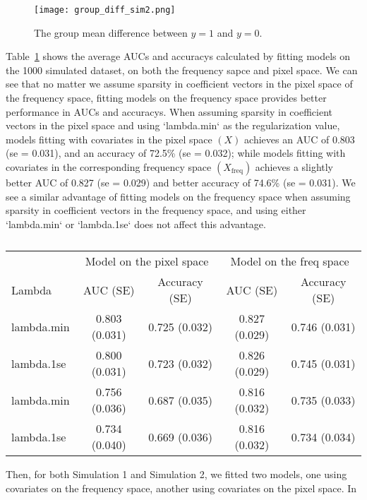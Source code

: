 \documentclass[12pt]{article}
\begin{document}
\begin{figure}[htbp]
	\centering
	\texttt{[image: group\_diff\_sim2.png]}
	\caption{The group mean difference between \( y = 1 \) and \( y = 0 \).}
	\label{fig:group_diff2}
\end{figure}

Table~\ref*{tab:auc_acc_table} shows the average AUCs and accuracys calculated
by fitting models on the 1000 simulated dataset, on both the frequency sapce
and pixel space. We can see that no matter we assume sparsity in coefficient
vectors in the pixel space of the frequency space, fitting models on the
frequency space provides better performance in AUCs and accuracys. When
assuming sparsity in coefficient vectors in the pixel space and using
`lambda.min` as the regularization value, models fitting with covariates in
the pixel space \( (X) \) achieves an AUC of 0.803 (se = 0.031), and an
accuracy of 72.5\% (se = 0.032); while models fitting with covariates in the
corresponding frequency space \( (X_{\text{freq}}) \) achieves a slightly
better AUC of 0.827 (se = 0.029) and better accuracy of 74.6\% (se = 0.031).
We see a similar advantage of fitting models on the frequency space when
assuming sparsity in coefficient vectors in the frequency space, and using
either `lambda.min` or `lambda.1se` does not affect this advantage.

\begin{table}[htbp]
\centering
\caption{}
\label{tab:auc_acc_table}
\begin{tabular}{l|cc|cc}
\toprule
& \multicolumn{2}{c}{Model on the pixel space} & \multicolumn{2}{c}{Model on the freq space} \\ 
	Lambda & AUC (SE) & Accuracy (SE) & AUC (SE) & Accuracy (SE) \\ 
\midrule
	lambda.min & 0.803 (0.031) & 0.725 (0.032) & 0.827 (0.029) & 0.746 (0.031) \\
	lambda.1se & 0.800 (0.031) & 0.723 (0.032) & 0.826 (0.029) & 0.745 (0.031) \\ 
	lambda.min & 0.756 (0.036) & 0.687 (0.035) & 0.816 (0.032) & 0.735 (0.033)  \\
	lambda.1se & 0.734 (0.040) & 0.669 (0.036) & 0.816 (0.032) & 0.734 (0.034) \\
\bottomrule
\end{tabular}
\end{table}

Then, for both Simulation 1 and Simulation 2, we fitted two models, one using
covariates on the frequency space, another using covariates on the pixel
space. In 
\end{document}
